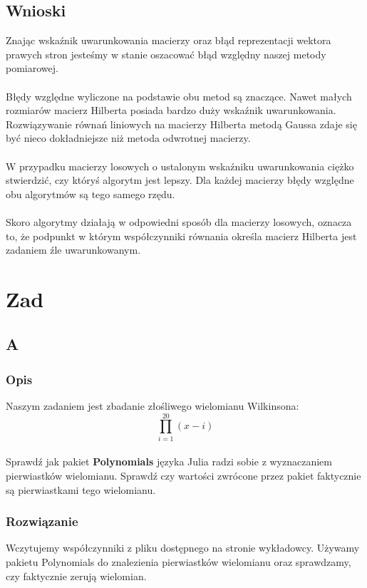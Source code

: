 \documentclass[10pt,a4paper, polish]{article}
\begin{document}
\subsection*{Wnioski}

Znając wskaźnik uwarunkowania macierzy oraz błąd reprezentacji wektora prawych stron jesteśmy w stanie oszacować błąd względny naszej metody pomiarowej.\\\\
Błędy względne wyliczone na podstawie obu metod są znaczące. Nawet małych rozmiarów macierz Hilberta posiada bardzo duży wskaźnik uwarunkowania. Rozwiązywanie równań liniowych na macierzy Hilberta metodą Gaussa zdaje się być nieco dokładniejsze niż metoda odwrotnej macierzy.\\\\
W przypadku macierzy losowych o ustalonym wskaźniku uwarunkowania ciężko stwierdzić, czy któryś algorytm jest lepszy. Dla każdej macierzy błędy względne obu algorytmów są tego samego rzędu.\\\\
Skoro algorytmy działają w odpowiedni sposób dla macierzy losowych, oznacza to, że podpunkt w którym współczynniki równania określa macierz Hilberta jest zadaniem źle uwarunkowanym.
\section{Zad}
\subsection*{A}
\subsubsection*{Opis}
Naszym zadaniem jest zbadanie złośliwego wielomianu Wilkinsona:
$$ \prod_{i=1}^{20}(x-i) $$\\
Sprawdź jak pakiet \textbf{Polynomials} języka Julia radzi sobie z wyznaczaniem pierwiastków wielomianu. Sprawdź czy wartości zwrócone przez pakiet faktycznie są pierwiastkami tego wielomianu.\\
\subsubsection*{Rozwiązanie}
Wczytujemy współczynniki z pliku dostępnego na stronie wykładowcy. Używamy pakietu Polynomials do znalezienia pierwiastków wielomianu oraz sprawdzamy, czy faktycznie zerują wielomian.\\
\end{document}
